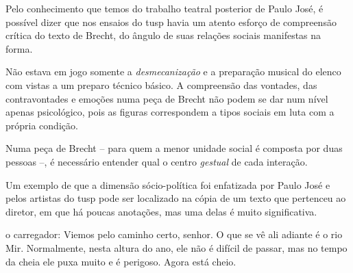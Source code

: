 \subject{Análise social do texto}

Pelo conhecimento que temos do trabalho teatral posterior de Paulo José,
é possível dizer que nos ensaios do {\sc tusp} havia um atento esforço de
compreensão crítica do texto de Brecht, do ângulo de suas relações
sociais manifestas na forma.

Não estava em jogo somente a {\it desmecanização} e a preparação musical
do elenco com vistas a um preparo técnico básico. A compreensão das
vontades, das contravontades e emoções numa peça de Brecht não podem se
dar num nível apenas psicológico, pois as figuras correspondem a tipos
sociais em luta com a própria condição.

Numa peça de Brecht -- para quem a menor unidade social é composta por
duas pessoas --, é necessário entender qual o centro {\it gestual} de cada
interação.

Um exemplo de que a dimensão sócio-política foi enfatizada por Paulo
José e pelos artistas do {\sc tusp} pode ser localizado na cópia de um texto
que pertenceu ao diretor, em que há poucas anotações, mas uma delas é
muito significativa.


\startblockquote
{\sc o carregador}: Viemos pelo caminho certo, senhor. O que se vê ali adiante
é o rio Mir. Normalmente, nesta altura do ano, ele não é difícil de
passar, mas no tempo da cheia ele puxa muito e é perigoso. Agora está
cheio.

